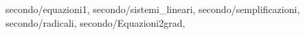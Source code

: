   secondo/equazioni1,
 secondo/sistemi_lineari,
	secondo/semplificazioni,
	secondo/radicali,
	secondo/Equazioni2grad,
	